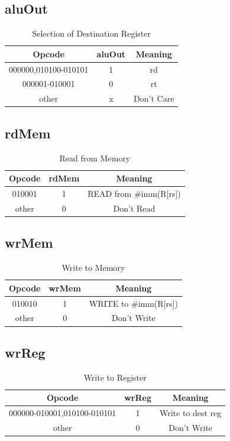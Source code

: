\documentclass{article}
\begin{document}
\subsection{aluOut}
\begin{table}[H]
    \centering
    \begin{tabular}{|c|c|c|}
        \hline
        \textbf{Opcode} & \textbf{aluOut} & \textbf{Meaning} \\
        \hline
        000000,010100-010101 & 1 & rd \\
        000001-010001 & 0 & rt \\
        other & x & Don't Care \\
        \hline
    \end{tabular}
    \caption{Selection of Destination Register}
\end{table}

\subsection{rdMem}
\begin{table}[H]
    \centering
    \begin{tabular}{|c|c|c|}
        \hline
        \textbf{Opcode} & \textbf{rdMem} & \textbf{Meaning} \\
        \hline
        010001 & 1 & READ from \#imm(R[rs]) \\
        other & 0 & Don't Read \\
        \hline
    \end{tabular}
    \caption{Read from Memory}
\end{table}

\subsection{wrMem}
\begin{table}[H]
    \centering
    \begin{tabular}{|c|c|c|}
        \hline
        \textbf{Opcode} & \textbf{wrMem} & \textbf{Meaning} \\
        \hline
        010010 & 1 & WRITE to \#imm(R[rs]) \\
        other & 0 & Don't Write \\
        \hline
    \end{tabular}
    \caption{Write to Memory}
\end{table}

\subsection{wrReg}
\begin{table}[H]
    \centering
    \begin{tabular}{|c|c|c|}
        \hline
        \textbf{Opcode} & \textbf{wrReg} & \textbf{Meaning} \\
        \hline
        000000-010001,010100-010101 & 1 & Write to dest reg \\
        other & 0 & Don't Write \\
        \hline
    \end{tabular}
    \caption{Write to Register}
\end{table}
\end{document}
